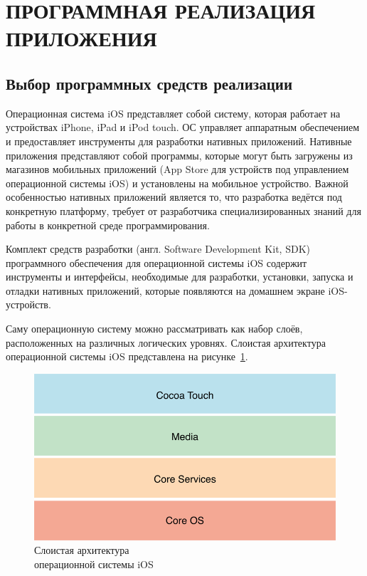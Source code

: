 \section[Программная реализация приложения]{%
  ПРОГРАММНАЯ РЕАЛИЗАЦИЯ ПРИЛОЖЕНИЯ
}\label{sec:implementation}

\subsection{Выбор программных средств реализации}


Операционная система iOS представляет собой систему, которая работает
на устройствах iPhone, iPad и iPod touch. ОС управляет аппаратным обеспечением
и предоставляет инструменты для разработки нативных приложений.
Нативные приложения представляют собой программы, которые могут быть загружены
из магазинов мобильных приложений (App Store для устройств под управлением
операционной системы iOS) и установлены на мобильное устройство.
Важной особенностью нативных приложений является то,
что разработка ведётся под конкретную платформу, требует
от разработчика специализированных знаний для работы в конкретной
среде программирования.

Комплект средств разработки (англ. Software Development Kit, SDK) программного
обеспечения для операционной системы iOS содержит инструменты
и интерфейсы, необходимые для разработки, установки, запуска
и отладки нативных приложений, которые появляются на домашнем экране iOS-устройств.

Саму операционную систему можно рассматривать как набор слоёв,
расположенных на различных логических уровнях. Слоистая архитектура операционной
системы iOS представлена на рисунке~\ref{fig:ios_layers}.
\begin{figure}[h!]
  \centering
  \includegraphics[width=130mm]{fig/ios_layers}
  \caption{Слоистая архитектура \\ операционной системы iOS}
  \label{fig:ios_layers}
\end{figure}

